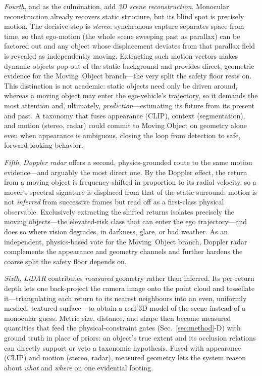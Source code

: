 \documentclass[conference]{IEEEtran}
\begin{document}
\emph{Fourth}, and as the culmination, add \emph{3D scene reconstruction}.
Monocular reconstruction already recovers static structure, but its blind spot is
precisely motion. The decisive step is \emph{stereo}: synchronous capture
separates space from time, so that ego-motion (the whole scene sweeping past as
parallax) can be factored out and any object whose displacement deviates from that
parallax field is revealed as independently moving. Extracting such motion vectors
makes dynamic objects pop out of the static background and provides direct,
geometric evidence for the \textsf{Moving~Object} branch---the very split the
safety floor rests on. This distinction is not academic: static objects need only
be driven around, whereas a moving object may enter the ego-vehicle's trajectory,
so it demands the most attention and, ultimately, \emph{prediction}---estimating
its future from its present and past. A taxonomy that fuses appearance (CLIP),
context (segmentation), and motion (stereo, radar) could commit to \textsf{Moving
Object} on geometry alone even when appearance is ambiguous, closing the loop from
detection to safe, forward-looking behavior.

\emph{Fifth}, \emph{Doppler radar} offers a second, physics-grounded route to the
same motion evidence---and arguably the most direct one. By the Doppler effect,
the return from a moving object is frequency-shifted in proportion to its radial
velocity, so a mover's spectral signature is displaced from that of the static
surround: motion is not \emph{inferred} from successive frames but read off as a
first-class physical observable. Exclusively extracting the shifted returns
isolates precisely the moving objects---the elevated-risk class that can enter the
ego trajectory---and does so where vision degrades, in darkness, glare, or bad
weather. As an independent, physics-based vote for the \textsf{Moving~Object}
branch, Doppler radar complements the appearance and geometry channels and further
hardens the coarse split the safety floor depends on.

\emph{Sixth}, \emph{LiDAR} contributes \emph{measured} geometry rather than
inferred. Its per-return depth lets one back-project the camera image onto the
point cloud and tessellate it---triangulating each return to its nearest
neighbours into an even, uniformly meshed, textured surface---to obtain a real 3D
model of the scene instead of a monocular guess. Metric size, distance, and shape
then become measured quantities that feed the physical-constraint gates
(Sec.~\ref{sec:method}-D) with ground truth in place of priors: an object's true
extent and its occlusion relations can directly support or veto a taxonomic
hypothesis. Fused with appearance (CLIP) and motion (stereo, radar), measured
geometry lets the system reason about \emph{what} and \emph{where} on one
evidential footing.
\end{document}
